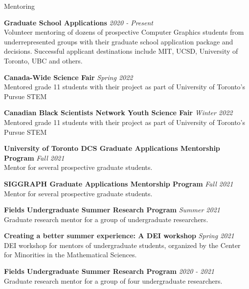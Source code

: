 \documentclass{resume}
\newcommand{\cvitem}[3]{
    {\bf #1} \hfill {\em \small #2} \\ 
    {\small#3 }
}
\begin{document}
\begin{rSection}{Mentoring}

\cvitem{Graduate School Applications}{2020 - Present}{Volunteer mentoring of dozens of prospective Computer Graphics students from underrepresented groups with their graduate school application package and decisions. Successful applicant destinations include MIT, UCSD, University of Toronto, UBC and others.}

\cvitem{Canada-Wide Science Fair}{Spring 2022}{Mentored grade 11 students with their project as part of University of Toronto's Pursue STEM}

\cvitem{Canadian Black Scientists Network Youth Science Fair}{Winter 2022}{Mentored grade 11 students with their project as part of University of Toronto's Pursue STEM}

\cvitem{University of Toronto DCS Graduate Applications Mentorship Program}{Fall 2021}{Mentor for several prospective graduate students.}

\cvitem{SIGGRAPH Graduate Applications Mentorship Program}{Fall 2021}{Mentor for several prospective graduate students.}

\cvitem{Fields Undergraduate Summer Research Program}{Summer 2021}{Graduate research mentor for a group of undergraduate researchers.}

\cvitem{Creating a better summer experience: A DEI workshop}{Spring 2021}{DEI workshop for mentors of undergraduate students, organized by the Center for Minorities in the Mathematical Sciences.}

\cvitem{Fields Undergraduate Summer Research Program}{2020 - 2021}{Graduate research mentor for a group of four undergraduate researchers.}

\end{rSection}
\end{document}
